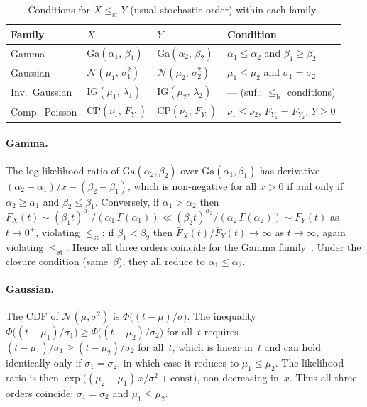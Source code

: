 \documentclass[11pt,a4paper]{article}
\theoremstyle{plain}
\theoremstyle{definition}
\theoremstyle{remark}
\begin{document}
\begin{table}[htbp]
\centering
\caption{Conditions for $X \le_{\mathrm{st}} Y$ (usual stochastic order) within each family.}
\label{tab:ordering_st}
\small
\begin{tabular}{@{}p{2.1cm}p{3.8cm}p{4.0cm}p{4.0cm}@{}}
\toprule
\textbf{Family} & $X$ & $Y$ & \textbf{Condition} \\
\midrule
Gamma
  & $\mathrm{Ga}(\alpha_1,\,\beta_1)$
  & $\mathrm{Ga}(\alpha_2,\,\beta_2)$
  & $\alpha_1 \le \alpha_2$ and $\beta_1 \ge \beta_2$ \\[4pt]
Gaussian
  & $\mathcal{N}(\mu_1,\,\sigma_1^2)$
  & $\mathcal{N}(\mu_2,\,\sigma_2^2)$
  & $\mu_1 \le \mu_2$ and $\sigma_1 = \sigma_2$ \\[4pt]
Inv.\ Gaussian
  & $\mathrm{IG}(\mu_1,\,\lambda_1)$
  & $\mathrm{IG}(\mu_2,\,\lambda_2)$
  & --- (suf.: $\le_{\mathrm{lr}}$ conditions) \\[4pt]
Comp.\ Poisson
  & $\mathrm{CP}(\nu_1,\,F_{Y_1})$
  & $\mathrm{CP}(\nu_2,\,F_{Y_2})$
  & $\nu_1 \le \nu_2$, $F_{Y_1} = F_{Y_2}$, $Y \ge 0$ \\
\bottomrule
\end{tabular}
\end{table}

\paragraph{Gamma.}
The log-likelihood ratio of $\mathrm{Ga}(\alpha_2,\beta_2)$ over $\mathrm{Ga}(\alpha_1,\beta_1)$ has derivative $(\alpha_2 - \alpha_1)/x - (\beta_2 - \beta_1)$, which is non-negative for all $x > 0$ if and only if $\alpha_2 \ge \alpha_1$ and $\beta_2 \le \beta_1$.
Conversely, if $\alpha_1 > \alpha_2$ then $F_X(t) \sim (\beta_1 t)^{\alpha_1}/(\alpha_1\,\Gamma(\alpha_1)) \ll (\beta_2 t)^{\alpha_2}/(\alpha_2\,\Gamma(\alpha_2)) \sim F_Y(t)$ as $t \to 0^+$, violating $\le_{\mathrm{st}}$;
if $\beta_1 < \beta_2$ then $\bar F_X(t)/\bar F_Y(t) \to \infty$ as $t \to \infty$, again violating $\le_{\mathrm{st}}$.
Hence all three orders coincide for the Gamma family~\cite[Sec.~1.C]{ShakedShanthikumar2007}.
Under the closure condition (same~$\beta$), they all reduce to $\alpha_1 \le \alpha_2$.

\paragraph{Gaussian.}
The CDF of $\mathcal{N}(\mu,\sigma^2)$ is $\Phi\bigl((t-\mu)/\sigma\bigr)$.
The inequality $\Phi\bigl((t-\mu_1)/\sigma_1\bigr) \ge \Phi\bigl((t-\mu_2)/\sigma_2\bigr)$ for all~$t$ requires $(t-\mu_1)/\sigma_1 \ge (t-\mu_2)/\sigma_2$ for all~$t$, which is linear in~$t$ and can hold identically only if $\sigma_1 = \sigma_2$, in which case it reduces to $\mu_1 \le \mu_2$.
The likelihood ratio is then $\exp\bigl((\mu_2-\mu_1)\,x/\sigma^2 + \text{const}\bigr)$, non-decreasing in~$x$.
Thus all three orders coincide: $\sigma_1 = \sigma_2$ and $\mu_1 \le \mu_2$.
\end{document}
